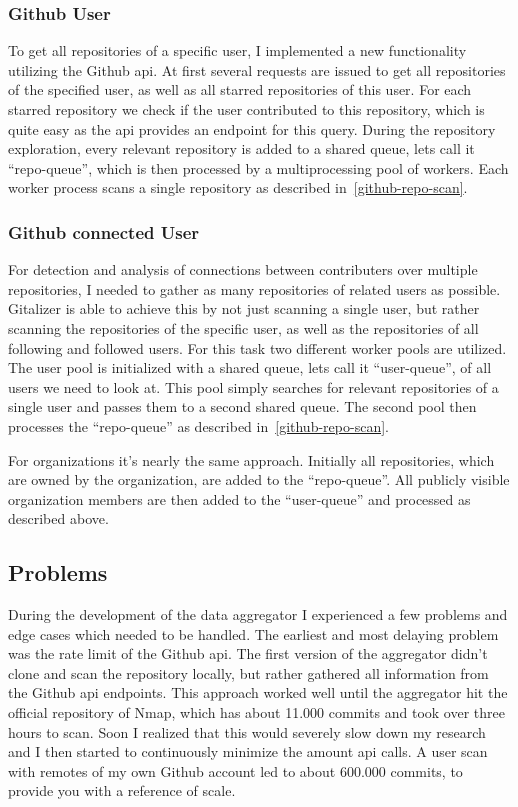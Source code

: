 \subsubsection{Github User}\label{github-user-scan}
To get all repositories of a specific user, I implemented a new functionality utilizing the Github \ac{api}.
At first several requests are issued to get all repositories of the specified user, as well as all starred repositories of this user.
For each starred repository we check if the user contributed to this repository, which is quite easy as the \ac{api} provides an endpoint for this query.
During the repository exploration, every relevant repository is added to a shared queue, lets call it ``repo-queue'', which is then processed by a multiprocessing pool of workers.
Each worker process scans a single repository as described in~\ref{github-repo-scan}.


\subsubsection{Github connected User}\label{github-user-remote-scan}
For detection and analysis of connections between contributers over multiple repositories, I needed to gather as many repositories of related users as possible.
Gitalizer is able to achieve this by not just scanning a single user, but rather scanning the repositories of the specific user, as well as the repositories of all following and followed users.
For this task two different worker pools are utilized.
The user pool is initialized with a shared queue, lets call it ``user-queue'', of all users we need to look at.
This pool simply searches for relevant repositories of a single user and passes them to a second shared queue.
The second pool then processes the ``repo-queue'' as described in~\ref{github-repo-scan}.

For organizations it's nearly the same approach.
Initially all repositories, which are owned by the organization, are added to the ``repo-queue''.
All publicly visible organization members are then added to the ``user-queue'' and processed as described above.


\subsection{Problems}
During the development of the data aggregator I experienced a few problems and edge cases which needed to be handled.
The earliest and most delaying problem was the rate limit of the Github \ac{api}.
The first version of the aggregator didn't clone and scan the repository locally, but rather gathered all information from the Github \ac{api} endpoints.
This approach worked well until the aggregator hit the official repository of Nmap, which has about 11.000 commits and took over three hours to scan.
Soon I realized that this would severely slow down my research and I then started to continuously minimize the amount \ac{api} calls.
A user scan with remotes of my own Github account led to about 600.000 commits, to provide you with a reference of scale.

